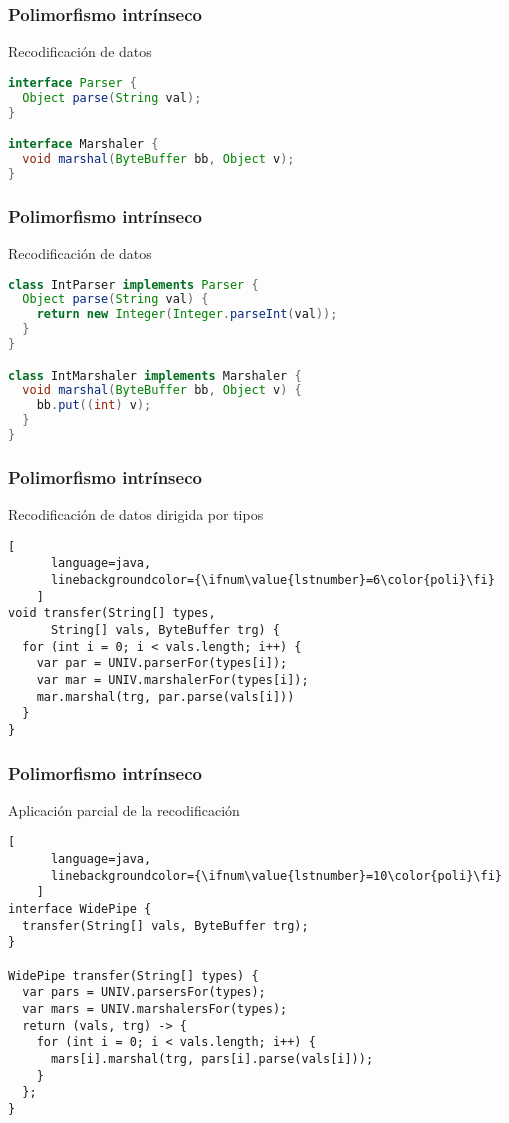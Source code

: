 
\def\ft{Polimorfismo intrínseco}

\begin{frame}[fragile]
  \frametitle{\ft}
  \begin{block}{Recodificación de datos}
    \begin{lstlisting}[language=java]
interface Parser {
  Object parse(String val);
}

interface Marshaler {
  void marshal(ByteBuffer bb, Object v);
}
    \end{lstlisting}
  \end{block}
\end{frame}

\begin{frame}[fragile]
  \frametitle{\ft}
  \begin{block}{Recodificación de datos}
    \begin{lstlisting}[language=java]
class IntParser implements Parser {
  Object parse(String val) {
    return new Integer(Integer.parseInt(val));
  }
}

class IntMarshaler implements Marshaler {
  void marshal(ByteBuffer bb, Object v) {
    bb.put((int) v);
  }
}
    \end{lstlisting}
  \end{block}
\end{frame}

\begin{frame}[fragile]
  \frametitle{\ft}
  \begin{block}{Recodificación de datos dirigida por tipos}
    \begin{lstlisting}[
      language=java,
      linebackgroundcolor={\ifnum\value{lstnumber}=6\color{poli}\fi}
    ]
void transfer(String[] types,
      String[] vals, ByteBuffer trg) {
  for (int i = 0; i < vals.length; i++) {
    var par = UNIV.parserFor(types[i]);
    var mar = UNIV.marshalerFor(types[i]);
    mar.marshal(trg, par.parse(vals[i]))
  }
}
    \end{lstlisting}
  \end{block}
\end{frame}


\begin{frame}[fragile]
  \frametitle{\ft}
  \begin{block}{Aplicación parcial de la recodificación}
    \begin{lstlisting}[
      language=java,
      linebackgroundcolor={\ifnum\value{lstnumber}=10\color{poli}\fi}
    ]
interface WidePipe {
  transfer(String[] vals, ByteBuffer trg);
}

WidePipe transfer(String[] types) {
  var pars = UNIV.parsersFor(types);
  var mars = UNIV.marshalersFor(types);
  return (vals, trg) -> {
    for (int i = 0; i < vals.length; i++) {
      mars[i].marshal(trg, pars[i].parse(vals[i]));
    }
  };
}
    \end{lstlisting}
  \end{block}
\end{frame}

